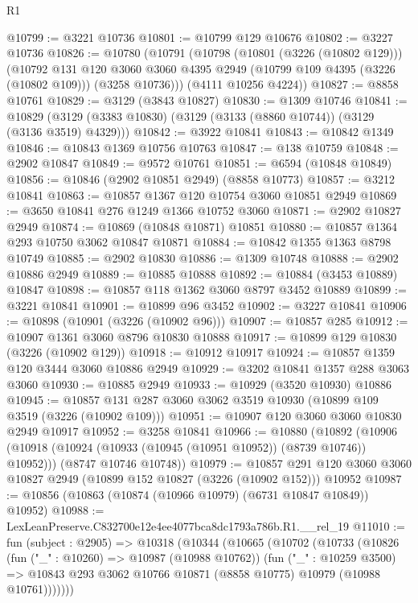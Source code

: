 \begin{lexlean}{R1}
\begin{coremodule}
@10799 := @3221 @10736
@10801 := @10799 @129 @10676
@10802 := @3227 @10736
@10826 := @10780
    (@10791
      (@10798
        (@10801 (@3226 (@10802 @129)))
        (@10792
          @131
          @120
          @3060
          @3060
          @4395
          @2949
          (@10799 @109 @4395 (@3226 (@10802 @109)))
          (@3258 @10736)))
      (@4111 @10256 @4224))
@10827 := @8858 @10761
@10829 := @3129 (@3843 @10827)
@10830 := @1309 @10746
@10841 := @10829 (@3129 (@3383 @10830) (@3129 (@3133 (@8860 @10744)) (@3129 (@3136 @3519) @4329)))
@10842 := @3922 @10841
@10843 := @10842 @1349
@10846 := @10843 @1369 @10756 @10763
@10847 := @138 @10759
@10848 := @2902 @10847
@10849 := @9572 @10761
@10851 := @6594 (@10848 @10849)
@10856 := @10846 (@2902 @10851 @2949) (@8858 @10773)
@10857 := @3212 @10841
@10863 := @10857 @1367 @120 @10754 @3060 @10851 @2949
@10869 := @3650 @10841 @276 @1249 @1366 @10752 @3060
@10871 := @2902 @10827 @2949
@10874 := @10869 (@10848 @10871) @10851
@10880 := @10857 @1364 @293 @10750 @3062 @10847 @10871
@10884 := @10842 @1355 @1363 @8798 @10749
@10885 := @2902 @10830
@10886 := @1309 @10748
@10888 := @2902 @10886 @2949
@10889 := @10885 @10888
@10892 := @10884 (@3453 @10889) @10847
@10898 := @10857 @118 @1362 @3060 @8797 @3452 @10889
@10899 := @3221 @10841
@10901 := @10899 @96 @3452
@10902 := @3227 @10841
@10906 := @10898 (@10901 (@3226 (@10902 @96)))
@10907 := @10857 @285
@10912 := @10907 @1361 @3060 @8796 @10830 @10888
@10917 := @10899 @129 @10830 (@3226 (@10902 @129))
@10918 := @10912 @10917
@10924 := @10857 @1359 @120 @3444 @3060 @10886 @2949
@10929 := @3202 @10841 @1357 @288 @3063 @3060
@10930 := @10885 @2949
@10933 := @10929 (@3520 @10930) @10886
@10945 := @10857 @131 @287 @3060 @3062 @3519 @10930 (@10899 @109 @3519 (@3226 (@10902 @109)))
@10951 := @10907 @120 @3060 @3060 @10830 @2949 @10917
@10952 := @3258 @10841
@10966 := @10880
    (@10892
      (@10906 (@10918 (@10924 (@10933 (@10945 (@10951 @10952)) (@8739 @10746)) @10952)))
      (@8747 @10746 @10748))
@10979 := @10857
    @291
    @120
    @3060
    @3060
    @10827
    @2949
    (@10899 @152 @10827 (@3226 (@10902 @152)))
    @10952
@10987 := @10856 (@10863 (@10874 (@10966 @10979) (@6731 @10847 @10849)) @10952)
@10988 := LexLeanPreserve.C832700e12e4ee4077bca8dc1793a786b.R1.__rel_19
@11010 := fun (subject : @2905) =>
  @10318
    (@10344
      (@10665
        (@10702
          (@10733
            (@10826
              (fun ("_" : @10260) => @10987 (@10988 @10762))
              (fun ("_" : @10259 @3500) =>
              @10843 @293 @3062 @10766 @10871 (@8858 @10775) @10979 (@10988 @10761)))))))

\end{coremodule}
\end{lexlean}

